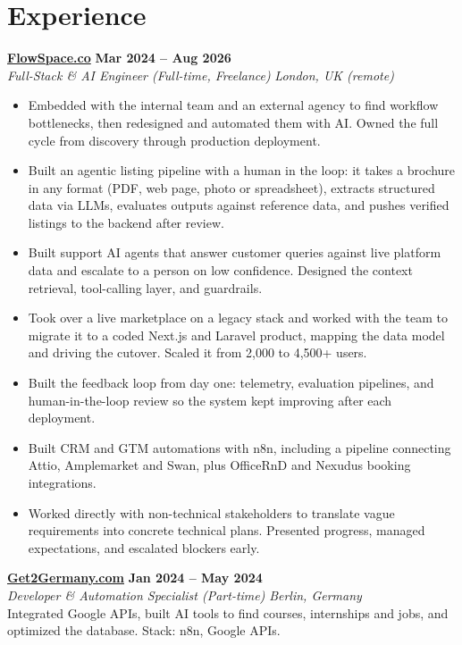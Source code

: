 \documentclass[a4paper,10pt]{article}
\newcommand{\role}[4]{%
 \textbf{#1} \hfill \textbf{#2}\\[1pt]%
 \textit{#3} \hfill \textit{#4}\\[2pt]%
}
\begin{document}
\section{Experience}

\role{\href{https://flowspace.co}{FlowSpace.co}}{Mar 2024 -- Aug 2026}{Full-Stack \& AI Engineer (Full-time, Freelance)}{London, UK (remote)}
\begin{itemize}
 \item Embedded with the internal team and an external agency to find workflow bottlenecks, then redesigned and automated them with AI. Owned the full cycle from discovery through production deployment.
 \item Built an agentic listing pipeline with a human in the loop: it takes a brochure in any format (PDF, web page, photo or spreadsheet), extracts structured data via LLMs, evaluates outputs against reference data, and pushes verified listings to the backend after review.
 \item Built support AI agents that answer customer queries against live platform data and escalate to a person on low confidence. Designed the context retrieval, tool-calling layer, and guardrails.
 \item Took over a live marketplace on a legacy stack and worked with the team to migrate it to a coded Next.js and Laravel product, mapping the data model and driving the cutover. Scaled it from 2,000 to 4,500+ users.
 \item Built the feedback loop from day one: telemetry, evaluation pipelines, and human-in-the-loop review so the system kept improving after each deployment.
 \item Built CRM and GTM automations with n8n, including a pipeline connecting Attio, Amplemarket and Swan, plus OfficeRnD and Nexudus booking integrations.
 \item Worked directly with non-technical stakeholders to translate vague requirements into concrete technical plans. Presented progress, managed expectations, and escalated blockers early.
\end{itemize}

\role{\href{https://get2germany.com}{Get2Germany.com}}{Jan 2024 -- May 2024}{Developer \& Automation Specialist (Part-time)}{Berlin, Germany}
Integrated Google APIs, built AI tools to find courses, internships and jobs, and optimized the database. Stack: n8n, Google APIs.\\[1pt]
\end{document}
